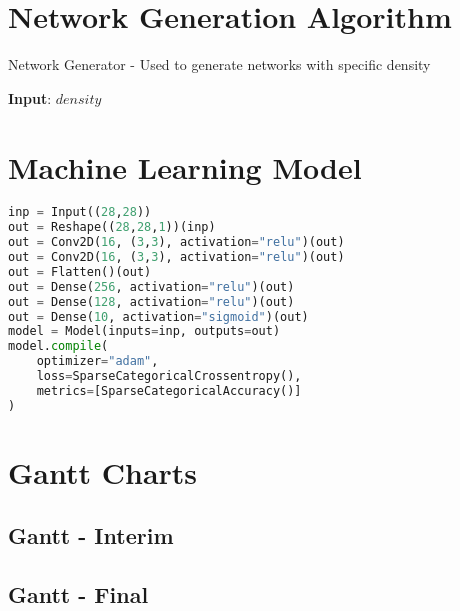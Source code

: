 \chapter{Network Generation Algorithm}
\begin{algorithm}[H]
	\caption{Network Generator - Used to generate networks with specific density}
	\textbf{Input}: $density$
	\newline
	\begin{algorithmic}[1]
		\State {}
		
	\end{algorithmic}
\end{algorithm}


\chapter{Machine Learning Model} \label{ap:model}
\begin{lstlisting}[language=Python]
inp = Input((28,28))
out = Reshape((28,28,1))(inp)
out = Conv2D(16, (3,3), activation="relu")(out)
out = Conv2D(16, (3,3), activation="relu")(out)
out = Flatten()(out)
out = Dense(256, activation="relu")(out)
out = Dense(128, activation="relu")(out)
out = Dense(10, activation="sigmoid")(out)
model = Model(inputs=inp, outputs=out)
model.compile(
	optimizer="adam",
	loss=SparseCategoricalCrossentropy(),
	metrics=[SparseCategoricalAccuracy()]
)
\end{lstlisting}

\chapter{Gantt Charts}
\newpage
\section{Gantt - Interim} \label{gc-interim}
\begin{center}
\end{center}

\section{Gantt - Final} \label{gc-final}
\begin{center}
\end{center}